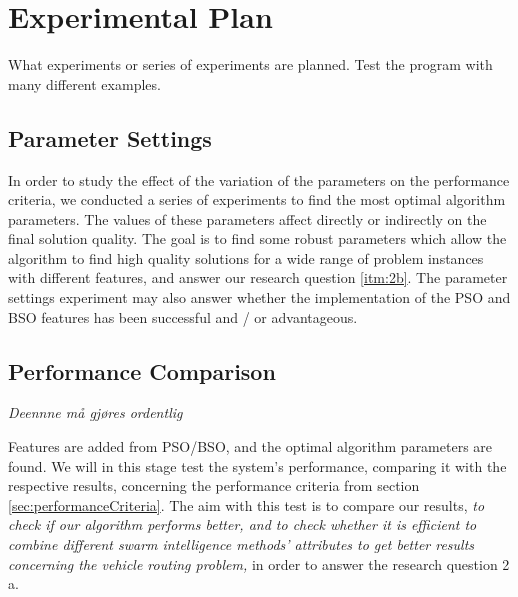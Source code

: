 \section{Experimental Plan}

What experiments or series of experiments are planned. Test the program with many different examples.

\subsection{Parameter Settings}
\label{subsec:parameterSettings_plan}

In order to study the effect of the variation of the parameters on the performance criteria, we conducted a series of experiments to find the most optimal algorithm parameters. The values of these parameters affect directly or indirectly on the final solution quality. The goal is to find some robust parameters which allow the algorithm to find high quality solutions for a wide range of problem instances with different features, and answer our research question \vref{itm:2b}. The parameter settings experiment may also answer whether the implementation of the PSO and BSO features has been successful and / or advantageous. 

\subsection{Performance Comparison}
\emph{\color{red}Deennne må gjøres ordentlig}

Features are added from PSO/BSO, and the optimal algorithm parameters are found. We will in this stage test the system's performance, comparing it with the respective results, concerning the performance criteria from section \vref{sec:performanceCriteria}. %
The aim with this test is to compare our results, \emph{\color{red}to check if our algorithm performs better, and to check whether it is efficient to combine different swarm intelligence methods' attributes to get better results concerning the vehicle routing problem,} in order to answer the research question 2 a.

